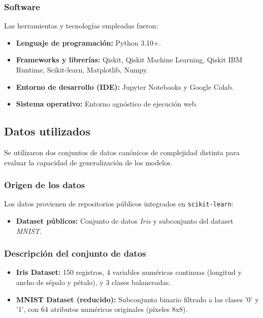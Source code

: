\subsubsection{Software}
Las herramientas y tecnolog\'ias empleadas fueron:
\begin{itemize}
    \item \textbf{Lenguaje de programaci\'on:} Python 3.10+.
    \item \textbf{Frameworks y librer\'ias:} Qiskit, Qiskit Machine Learning, Qiskit IBM Runtime, Scikit-learn, Matplotlib, Numpy.
    \item \textbf{Entorno de desarrollo (IDE):} Jupyter Notebooks y Google Colab.
    \item \textbf{Sistema operativo:} Entorno agn\'ostico de ejecuci\'on web.
\end{itemize}

\subsection{Datos utilizados}
Se utilizaron dos conjuntos de datos can\'onicos de complejidad distinta para evaluar la capacidad de generalizaci\'on de los modelos.

\subsubsection{Origen de los datos}
Los datos provienen de repositorios p\'ublicos integrados en \texttt{scikit-learn}:
\begin{itemize}
    \item \textbf{Dataset p\'ublicos:} Conjunto de datos \textit{Iris} y subconjunto del dataset \textit{MNIST}.
\end{itemize}

\subsubsection{Descripci\'on del conjunto de datos}
\begin{itemize}
    \item \textbf{Iris Dataset:} 150 registros, 4 variables num\'ericas continuas (longitud y ancho de s\'epalo y p\'etalo), y 3 clases balanceadas.
    \item \textbf{MNIST Dataset (reducido):} Subconjunto binario filtrado a las clases '0' y '1', con 64 atributos num\'ericos originales (p\'ixeles 8x8).
\end{itemize}

